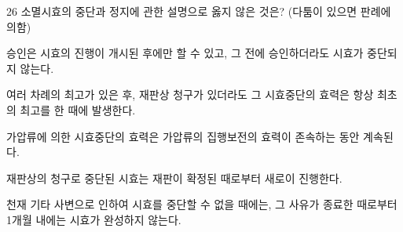 \begin{question}{26}
소멸시효의 중단과 정지에 관한 설명으로 옳지 않은 것은? (다툼이 있으면 판례에 의함)
\begin{choices}
  \item 승인은 시효의 진행이 개시된 후에만 할 수 있고, 그 전에 승인하더라도 시효가 중단되지 않는다.
  \item 여러 차례의 최고가 있은 후, 재판상 청구가 있더라도 그 시효중단의 효력은 항상 최초의 최고를 한 때에 발생한다.
  \item 가압류에 의한 시효중단의 효력은 가압류의 집행보전의 효력이 존속하는 동안 계속된다.
  \item 재판상의 청구로 중단된 시효는 재판이 확정된 때로부터 새로이 진행한다.
  \item 천재 기타 사변으로 인하여 시효를 중단할 수 없을 때에는, 그 사유가 종료한 때로부터 1개월 내에는 시효가 완성하지 않는다.
\end{choices}
\end{question}
